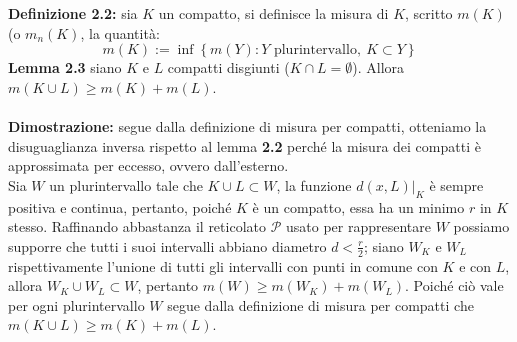 \documentclass{article}
\begin{document}
\textbf{Definizione 2.2:} sia $K$ un compatto, si definisce la misura di $K$, scritto $m(K)$ (o $m_n(K)$, la quantità:
\begin{equation}
    m(K) := \inf \left\{ m(Y) : Y \text{ plurintervallo}, \ K \subset Y \right\} \tag{2.2}
\end{equation}
\textbf{Lemma 2.3} siano $K$ e $L$ compatti disgiunti ($K \cap L = \emptyset$). Allora $m(K \cup L) \geq m(K) + m(L)$. \\ \\
\textbf{Dimostrazione:} segue dalla definizione di misura per compatti, otteniamo la disuguaglianza inversa rispetto al lemma \textbf{2.2} perché la misura dei compatti è approssimata per eccesso, ovvero dall'esterno. \\Sia $W$ un plurintervallo tale che $K \cup L \subset W$, la funzione $d(x, L)|_K$ è sempre positiva e continua, pertanto, poiché $K$ è un compatto, essa ha un minimo $r$ in $K$ stesso. Raffinando abbastanza il reticolato $\mathcal{P}$ usato per rappresentare $W$ possiamo supporre che tutti i suoi intervalli abbiano diametro $d < \frac{r}{2}$; siano $W_K$ e $W_L$ rispettivamente l'unione di tutti gli intervalli con punti in comune con $K$ e con $L$, allora $W_K \cup W_L \subset W$, pertanto $m(W) \geq m(W_K) + m(W_L)$. Poiché ciò vale per ogni plurintervallo $W$ segue dalla definizione di misura per compatti che $m(K \cup L) \geq m(K) + m(L)$.
\end{document}

